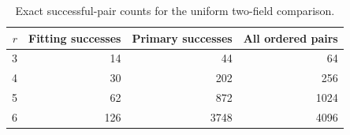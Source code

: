 \begin{table}[!htbp]
\centering\small
\setlength{\tabcolsep}{4pt}
\caption{Exact successful-pair counts for the uniform two-field comparison.}
\label{tab:probability}
\begin{tabular}{rrrr}
\toprule
$r$ & Fitting successes & Primary successes & All ordered pairs\\
\midrule
3 & 14 & 44 & 64\\
4 & 30 & 202 & 256\\
5 & 62 & 872 & 1024\\
6 & 126 & 3748 & 4096\\
\bottomrule
\end{tabular}
\end{table}
